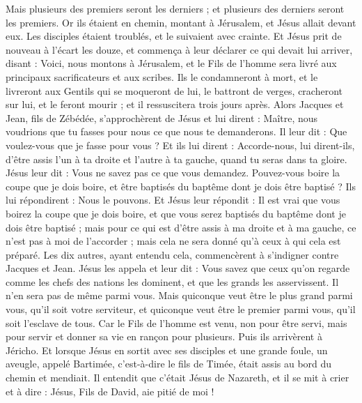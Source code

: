\begin{multicols}{2}
Mais plusieurs des premiers seront les derniers ; et plusieurs des derniers seront les premiers.
Or ils étaient en chemin, montant à Jérusalem, et Jésus allait devant eux. Les disciples étaient troublés, et le suivaient avec crainte. Et Jésus prit de nouveau à l'écart les douze, et commença à leur déclarer ce qui devait lui arriver,
disant : Voici, nous montons à Jérusalem, et le Fils de l'homme sera livré aux principaux sacrificateurs et aux scribes. Ils le condamneront à mort, et le livreront aux Gentils
qui se moqueront de lui, le battront de verges, cracheront sur lui, et le feront mourir ; et il ressuscitera trois jours après.
Alors Jacques et Jean, fils de Zébédée, s'approchèrent de Jésus et lui dirent : Maître, nous voudrions que tu fasses pour nous ce que nous te demanderons.
Il leur dit : Que voulez-vous que je fasse pour vous ?
Et ils lui dirent : Accorde-nous, lui dirent-ils, d'être assis l'un à ta droite et l'autre à ta gauche, quand tu seras dans ta gloire.
Jésus leur dit : Vous ne savez pas ce que vous demandez. Pouvez-vous boire la coupe que je dois boire, et être baptisés du baptême dont je dois être baptisé ?
Ils lui répondirent : Nous le pouvons. Et Jésus leur répondit : Il est vrai que vous boirez la coupe que je dois boire, et que vous serez baptisés du baptême dont je dois être baptisé ;
mais pour ce qui est d'être assis à ma droite et à ma gauche, ce n'est pas à moi de l'accorder ; mais cela ne sera donné qu'à ceux à qui cela est préparé.
Les dix autres, ayant entendu cela, commencèrent à s'indigner contre Jacques et Jean.
Jésus les appela et leur dit : Vous savez que ceux qu'on regarde comme les chefs des nations les dominent, et que les grands les asservissent.
Il n'en sera pas de même parmi vous. Mais quiconque veut être le plus grand parmi vous, qu'il soit votre serviteur,
et quiconque veut être le premier parmi vous, qu'il soit l'esclave de tous.
Car le Fils de l'homme est venu, non pour être servi, mais pour servir et donner sa vie en rançon pour plusieurs.
Puis ils arrivèrent à Jéricho. Et lorsque Jésus en sortit avec ses disciples et une grande foule, un aveugle, appelé Bartimée, c'est-à-dire le fils de Timée, était assis au bord du chemin et mendiait.
Il entendit que c'était Jésus de Nazareth, et il se mit à crier et à dire : Jésus, Fils de David, aie pitié de moi !

\end{multicols}
